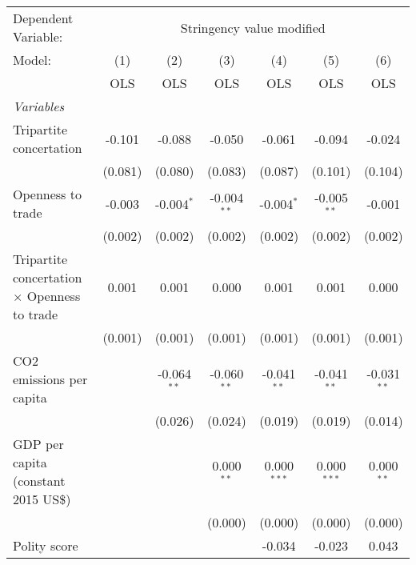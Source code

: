 
\begingroup
\centering
\begin{tabular}{lcccccc}
   \toprule
   Dependent Variable: & \multicolumn{6}{c}{Stringency value modified}\\
   Model:                                              & (1)     & (2)           & (3)           & (4)           & (5)           & (6)\\  
                                                       &  OLS    & OLS           & OLS           & OLS           & OLS           & OLS\\  
   \midrule
   \emph{Variables}\\
   Tripartite concertation                             & -0.101  & -0.088        & -0.050        & -0.061        & -0.094        & -0.024\\   
                                                       & (0.081) & (0.080)       & (0.083)       & (0.087)       & (0.101)       & (0.104)\\   
   Openness to trade                                   & -0.003  & -0.004$^{*}$  & -0.004$^{**}$ & -0.004$^{*}$  & -0.005$^{**}$ & -0.001\\   
                                                       & (0.002) & (0.002)       & (0.002)       & (0.002)       & (0.002)       & (0.002)\\   
   Tripartite concertation $\times$ Openness to trade  & 0.001   & 0.001         & 0.000         & 0.001         & 0.001         & 0.000\\   
                                                       & (0.001) & (0.001)       & (0.001)       & (0.001)       & (0.001)       & (0.001)\\   
   CO2 emissions per capita                            &         & -0.064$^{**}$ & -0.060$^{**}$ & -0.041$^{**}$ & -0.041$^{**}$ & -0.031$^{**}$\\   
                                                       &         & (0.026)       & (0.024)       & (0.019)       & (0.019)       & (0.014)\\   
   GDP per capita (constant 2015 US\$)                 &         &               & 0.000$^{**}$  & 0.000$^{***}$ & 0.000$^{***}$ & 0.000$^{**}$\\   
                                                       &         &               & (0.000)       & (0.000)       & (0.000)       & (0.000)\\   
   Polity score                                        &         &               &               & -0.034        & -0.023        & 0.043\\   

\end{tabular}
